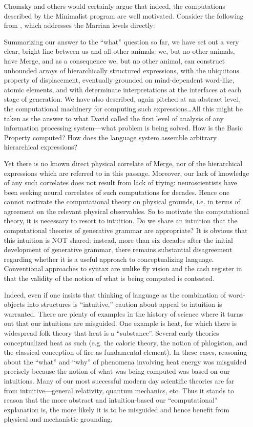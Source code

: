   Chomsky and others would certainly argue that indeed, the computations described by the Minimalist program are well motivated. Consider the following from \citet{BerwickChomsky2016}, which addresses the Marrian levels directly:

Summarizing our answer to the “what” question so far, we have set out a very clear, bright line between us and all other animals: we, but no other animals, have Merge, and as a consequence we, but no other animal, can construct unbounded arrays of hierarchically structured expressions, with the ubiquitous property of displacement, eventually grounded on mind-dependent word-like, atomic elements, and with determinate interpretations at the interfaces at each stage of generation. We have also described, again pitched at an abstract level, the computational machinery for computing such expressions…All this might be taken as the answer to what David \citet{Marr1982} called the first level of analysis of any information processing system—what problem is being solved. How is the Basic Property computed? How does the language system assemble arbitrary hierarchical expressions?

Yet there is no known direct physical correlate of Merge, nor of the hierarchical expressions which are referred to in this passage. Moreover, our lack of knowledge of any such correlates does not result from lack of trying: neuroscientists have been seeking neural correlates of such computations for decades. Hence one cannot motivate the computational theory on physical grounds, i.e. in terms of agreement on the relevant physical observables. So to motivate the computational theory, it is necessary to resort to intuition. Do we share an intuition that the computational theories of generative grammar are appropriate? It is obvious that this intuition is NOT shared; instead, more than six decades after the initial development of generative grammar, there remains substantial disagreement regarding whether it is a useful approach to conceptualizing language. Conventional approaches to syntax are unlike fly vision and the cash register in that the validity of the notion of what is being computed is contested.

Indeed, even if one insists that thinking of language as the combination of word-objects into structures is “intuitive,” caution about appeal to intuition is warranted. There are plenty of examples in the history of science where it turns out that our intuitions are misguided. One example is heat, for which there is widespread folk theory that heat is a “substance”. Several early theories conceptualized heat as such (e.g. the caloric theory, the notion of phlogiston, and the classical conception of fire as fundamental element). In these cases, reasoning about the “what” and “why” of phenomena involving heat energy was misguided precisely because the notion of what was being computed was based on our intuitions. Many of our most successful modern day scientific theories are far from intuitive—general relativity, quantum mechanics, etc. Thus it stands to reason that the more abstract and intuition-based our “computational” explanation is, the more likely it is to be misguided and hence benefit from physical and mechanistic grounding.

